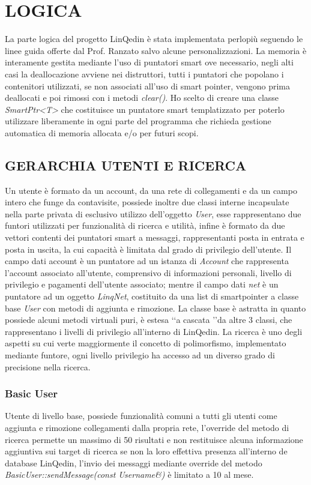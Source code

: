 \section*{LOGICA}
La parte logica del progetto LinQedin è stata implementata perlopiù seguendo le linee guida offerte dal Prof. Ranzato salvo alcune personalizzazioni. La memoria
è interamente gestita mediante l'uso di puntatori smart ove necessario, negli alti casi la deallocazione avviene nei distruttori, tutti i puntatori che popolano i contenitori
utilizzati, se non associati all'uso di smart pointer, vengono prima deallocati e poi rimossi con i metodi \textit{clear()}.
Ho scelto di creare una classe \textit{SmartPtr<T>} che costituisce un puntatore smart templatizzato per poterlo utilizzare liberamente in ogni parte del programma che richieda
gestione automatica di memoria allocata e/o per futuri scopi.
\subsection*{GERARCHIA UTENTI E RICERCA}
Un utente è formato da un account, da una rete di collegamenti e da un campo intero che funge da contavisite, possiede inoltre due classi interne
incapsulate nella parte privata di esclusivo utilizzo dell'oggetto \textit{User}, esse rappresentano due funtori utilizzati per funzionalità di
ricerca e utilità, infine è formato da due vettori contenti dei puntatori smart a messaggi, rappresentanti posta in entrata e posta in uscita, la cui capacità
è limitata dal grado di privilegio dell'utente.
Il campo dati account è un puntatore ad un istanza di \textit{Account} che rappresenta l'account associato all'utente, comprensivo di informazioni
personali, livello di privilegio e pagamenti dell'utente associato; mentre il campo dati \textit{net} è un puntatore ad un oggetto \textit{LinqNet},
costituito da una list di smartpointer a classe base \textit{User} con metodi di aggiunta e rimozione.
La classe base è astratta in quanto possiede alcuni metodi virtuali puri, è estesa \lq\lq a cascata \rq\rq da altre 3 classi, che rappresentano
i livelli di privilegio all'interno di LinQedin. La ricerca è uno degli aspetti su cui verte maggiormente il concetto di polimorfismo, implementato mediante funtore,
ogni livello privilegio ha accesso ad un diverso grado di precisione nella ricerca.
\subsubsection*{Basic User}
Utente di livello base, possiede funzionalità comuni a tutti gli utenti come aggiunta e rimozione collegamenti dalla propria rete, l'override del metodo
di ricerca permette un massimo di 50 risultati e non restituisce alcuna informazione aggiuntiva sui target di ricerca se non la loro effettiva
presenza all'interno de database LinQedin, l'invio dei messaggi mediante override del metodo \textit{BasicUser::sendMessage(const Username\&)} è limitato a 10 al mese.
